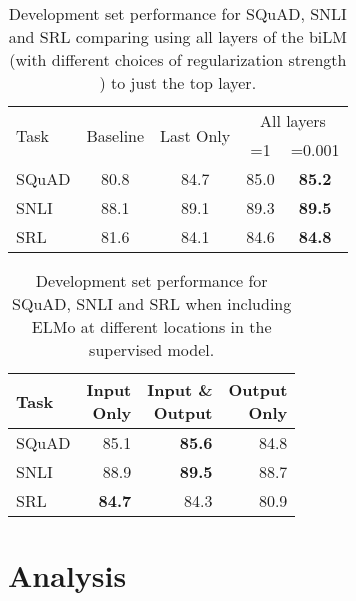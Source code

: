 \documentclass[11pt,a4paper]{article}
\newcommand{\ELMO}{ELMo}
\begin{document}
\begin{table}
\centering
\begin{tabular}[t]{l|c|c|cc}
\multirow{2}{*}{Task} & \multirow{2}{*}{Baseline} & \multirow{2}{*}{Last Only} & \multicolumn{2}{c}{All layers} \\ 
 & & & =1 & =0.001 \\ \hline \hline
SQuAD     &     80.8     & 84.7   & 85.0        &      \textbf{85.2} \\
SNLI   &    88.1    & 89.1   & 89.3        &      \textbf{89.5}  \\
SRL    &    81.6     & 84.1   & 84.6        &      \textbf{84.8} \\
\end{tabular}
\caption{Development set performance for SQuAD, SNLI and SRL comparing using all layers of the biLM (with different choices of regularization strength ) to just the top layer.}
\label{table:alternate_weights}
\end{table}

\begin{table}
\centering
\begin{tabular}[t]{p{8ex}|r|r|r}
Task & \parbox{8ex}{Input \\ Only} & \parbox{7ex}{Input \& \\ Output} & \parbox{6ex}{Output \\ Only} \\ \hline \hline
SQuAD        & 85.1        & \textbf{85.6}   & 84.8 \\
SNLI         & 88.9        &  \textbf{89.5}  &            88.7  \\
SRL          & \textbf{84.7}        &  84.3  &            80.9  \\
\end{tabular}
\caption{Development set performance for SQuAD, SNLI and SRL when including \ELMO{} at different locations in the supervised model.}
\label{table:where_to_include_elmo}
\end{table}




\section{Analysis}
\end{document}
